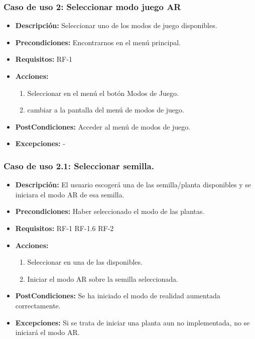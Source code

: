 \subsubsection{Caso de uso 2:  Seleccionar modo juego AR}
 \begin{itemize}
 	\item \textbf{Descripción:} Seleccionar uno de los modos de juego disponibles.
 	\item \textbf{Precondiciones:} Encontrarnos en el menú principal.
 	\item \textbf{Requisitos:} RF-1
 	\item \textbf{Acciones:}
 	\begin{enumerate}
 		\item Seleccionar en el menú el botón Modos de Juego.
 		\item cambiar a la pantalla del menú de modos de juego.
 	\end{enumerate}
 	\item \textbf{PostCondiciones:} Acceder al menú de modos de juego.
 	\item \textbf{Excepciones:}	-
 \end{itemize}
\subsubsection{Caso de uso 2.1: Seleccionar semilla.}
\begin{itemize}
	\item \textbf{Descripción:} El usuario escogerá una de las semilla/planta disponibles y se iniciara el modo AR de esa semilla.
	\item \textbf{Precondiciones:} Haber seleccionado el modo de las plantas.
	\item \textbf{Requisitos:} RF-1 RF-1.6 RF-2
	\item \textbf{Acciones:}
	\begin{enumerate}
		\item Seleccionar en una de las disponibles.
		\item Iniciar el modo AR sobre la semilla seleccionada.
	\end{enumerate}
	\item \textbf{PostCondiciones:} Se ha iniciado el modo de realidad aumentada correctamente.
	\item \textbf{Excepciones:} Si se trata de iniciar una planta aun no implementada, no se iniciará el modo AR.
\end{itemize}

